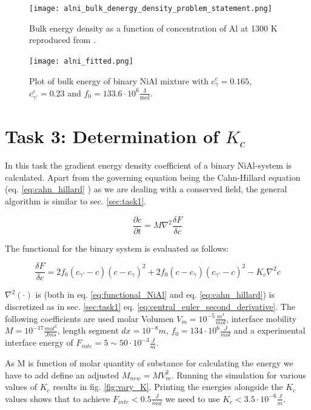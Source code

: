 \begin{figure}[htb]
	\centering\texttt{[image: alni\_bulk\_denergy\_density\_problem\_statement.png]}
	\caption{Bulk energy density as a function of concentration of Al at 1300 K reproduced from \cite{zaisera}.}
	\label{fig:AlNi_problem_statement}
\end{figure}

\begin{figure}[htb]
	\centering
	\texttt{[image: alni\_fitted.png]}
	\caption{Plot of bulk energy of binary NiAl mixture with \(c_{\gamma}^{e} = 0.165\),  \(c_{\gamma '}^{e} = 0.23\) and \(f_{0} = 133.6 \cdot 10^{6} \frac{\mathrm{J}}{\mathrm{mol}} \).}
	\label{fig:alni_fitted}
\end{figure}



\section{Task 3: Determination of \(K_{c}\) }
In this task the gradient energy density coefficient of a binary NiAl-system is calculated. Apart from the governing equation being the Cahn-Hillard equation (eq. \ref{eq:cahn_hillard} ) as we are dealing with a conserved field, the general algorithm is similar to sec. \ref{sec:task1}. 

\begin{equation}
	\frac{ \partial c}{ \partial t} = M \nabla^{2} \frac{\delta F}{\delta c} \label{eq:cahn_hillard}
\end{equation} 

The functional for the binary system is evaluated as follows:

\begin{equation}
	\frac{\delta F}{\delta c} = 2 f_{0}(c_{\gamma '} - c )(c - c_{\gamma})^2 + 2 f_{0} (c - c_{\gamma})(c_{\gamma '} - c )^{2} - K_{c} \nabla^{2} c  \label{eq:functional_NiAl}
\end{equation}
		
\(\nabla^{2}(\cdot)\) is (both in eq. \ref{eq:functional_NiAl} and eq. \ref{eq:cahn_hillard}) is discretized as in sec. \ref{sec:task1} eq. \ref{eq:central_euler_second_derivative}.  The following coefficients are used molar Volumen \(V_{m} = 10^{-5} \frac{m^{3}}{mol}\), interface mobility \(M = 10^{-17} \frac{mol^{2}}{J m s}\), length segment \(dx = 10^{-8} m\), \(f_{0} = 134 \cdot 10^{6} \frac{J}{mol}\) and a experimental interface energy of \( F_{inte} = 5 \sim 50 \cdot 10^{-3} \frac{J}{m}\). 

As M is function of molar quantity of substance for calculating the energy we have to add define an adjusted \( M_{new} = M V_{m}^{2}\). Running the simulation for various values of \(K_{c}\) results in fig. \ref{fig:vary_K}. Printing the energies alongside the \(K_{c}\) values shows that to achieve \(F_{inte} < 0.5 \frac{J}{mol}\) we need to use \(K_{c} < 3.5 \cdot 10^{-6} \frac{J}{m}\).

